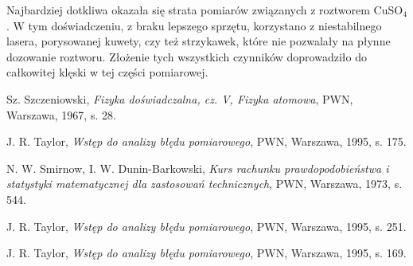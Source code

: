 \documentclass[10pt,a4paper]{article}
\begin{document}
Najbardziej dotkliwa okazała się strata pomiarów związanych z roztworem CuSO$_{4}$. W tym doświadczeniu, z braku lepszego sprzętu, korzystano z niestabilnego lasera, porysowanej kuwety, czy też strzykawek, które nie pozwalały na płynne dozowanie roztworu. Złożenie tych wszystkich czynników doprowadziło do całkowitej klęski w tej części pomiarowej.


\begin{center}
\begin{thebibliography}{9}

 Sz. Szczeniowski,
 \emph{Fizyka doświadczalna, cz. V, Fizyka atomowa},
 PWN, Warszawa, 1967, s. 28.

 J. R. Taylor,
 \emph{Wstęp do analizy błędu pomiarowego},
 PWN, Warszawa, 1995, s. 175.
 
  N. W. Smirnow, I. W. Dunin-Barkowski,
  \emph{Kurs rachunku prawdopodobieństwa i statystyki matematycznej dla zastosowań technicznych},
  PWN, Warszawa, 1973, s. 544.
  
 J. R. Taylor,
 \emph{Wstęp do analizy błędu pomiarowego},
 PWN, Warszawa, 1995, s. 251.
 
 J. R. Taylor,
 \emph{Wstęp do analizy błędu pomiarowego},
 PWN, Warszawa, 1995, s. 169. 
  

 
  \end{thebibliography}


\end{center}
\end{document}
